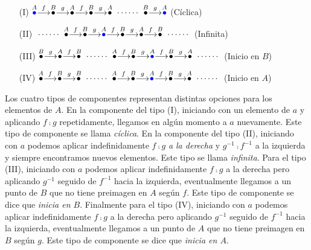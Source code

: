 \begin{itemize}
\item[(I)] 
$
\stackrel{{A}}{\textcolor{blue}{\bullet}}\stackrel{f}{\longrightarrow}\stackrel{B}{\bullet}\stackrel{g}{\longrightarrow}
\stackrel{A}{\bullet}\stackrel{f}{\longrightarrow}
\stackrel{B}{\bullet}\stackrel{g}{\longrightarrow}\stackrel{A}{\bullet} \; \cdots\cdots \; \stackrel{B}{\bullet}\stackrel{g}{\longrightarrow}
\stackrel{{A}}{\textcolor{blue}{\bullet}}
$ \hfill (Cíclica)
\item[(II)] 
$
\;\cdots\cdots\; \stackrel{{A}}{{\bullet}}\stackrel{f}{\longrightarrow}\stackrel{B}{\bullet}\stackrel{g}{\longrightarrow}
\stackrel{A}{\textcolor{blue}{\bullet}}\stackrel{f}{\longrightarrow}
\stackrel{B}{\bullet}\stackrel{g}{\longrightarrow}\stackrel{A}{{\bullet}}\stackrel{f}{\longrightarrow}
\stackrel{B}{\bullet} \; \cdots\cdots \;
$
\hfill (Infinita)
\item[(III)] 
$
\stackrel{B}{\bullet}\stackrel{g}{\longrightarrow}\stackrel{A}{{\bullet}}\stackrel{f}{\longrightarrow}\stackrel{B}{\bullet} 
\;\cdots\cdots\; \stackrel{{A}}{{\bullet}}\stackrel{f}{\longrightarrow}\stackrel{B}{\bullet}\stackrel{g}{\longrightarrow}
\stackrel{A}{\textcolor{blue}{\bullet}}\stackrel{f}{\longrightarrow}
\stackrel{B}{\bullet}\stackrel{g}{\longrightarrow}\stackrel{A}{{\bullet}} \; \cdots\cdots \;
$
\hfill (Inicio en $B$)
\item[(IV)] 
$
\stackrel{A}{\bullet}\stackrel{f}{\longrightarrow}\stackrel{B}{{\bullet}}\stackrel{g}{\longrightarrow}\stackrel{B}{\bullet} 
\;\cdots\cdots\; \stackrel{{A}}{{\bullet}}\stackrel{f}{\longrightarrow}\stackrel{B}{\bullet}\stackrel{g}{\longrightarrow}
\stackrel{A}{\textcolor{blue}{\bullet}}\stackrel{f}{\longrightarrow}
\stackrel{B}{\bullet}\stackrel{g}{\longrightarrow}\stackrel{A}{{\bullet}} \; \cdots\cdots \;
$
\hfill (Inicio en $A$)
\end{itemize}
Los cuatro tipos de componentes representan distintas opciones para los elementos de $A$.
En la componente del tipo (I), iniciando con un elemento de $a$ y aplicando $f\comp g$ repetidamente, llegamos en algún momento
a $a$ nuevamente. Este tipo de componente se llama \emph{cíclica}.
En la componente del tipo (II), iniciando con $a$ podemos aplicar indefinidamente $f\comp g$ \emph{a la derecha} y $g^{-1}\comp f^{-1}$
a la izquierda y siempre encontramos nuevos elementos.
Este tipo se llama \emph{infinita}.
Para el tipo (III), iniciando con $a$ podemos aplicar indefinidamente $f\comp g$ {a la derecha} pero aplicando $g^{-1}$ seguido de
$f^{-1}$ hacia la izquierda, eventualmente llegamos a un punto de $B$ que no tiene preimagen en $A$ según $f$. Este tipo de componente
se dice que \emph{inicia en $B$}.
Finalmente para el tipo (IV), iniciando con $a$ podemos aplicar indefinidamente $f\comp g$ {a la derecha} pero aplicando $g^{-1}$ seguido de
$f^{-1}$ hacia la izquierda, eventualmente llegamos a un punto de $A$ que no tiene preimagen en $B$ según $g$. Este tipo de componente
se dice que \emph{inicia en $A$}.

